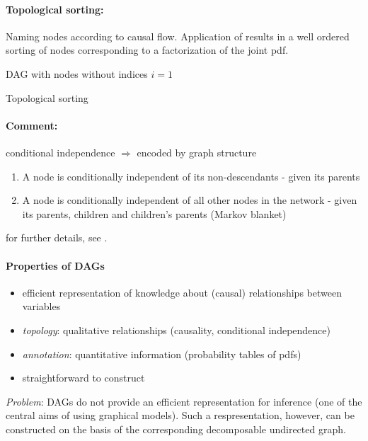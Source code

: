 \paragraph{Topological sorting:} Naming nodes according to causal
flow. Application of  results
in a well ordered sorting of nodes corresponding to a factorization of
the joint pdf.
\begin{algorithm}
  \DontPrintSemicolon
  DAG with nodes without indices\;
  $i = 1$\;
\caption{Topological sorting}
\label{alg:topological-sorting}
\end{algorithm}

\paragraph{Comment:} conditional independence $\Rightarrow$ encoded by graph structure
\begin{enumerate}[(1)]
\item A node is conditionally independent of its non-descendants - given its parents
\item A node is conditionally independent of all other nodes in the network - given its parents, children and children's parents (Markov blanket)
\end{enumerate}
for further details, see \textcite[ch.14, Fig 14.4]{RussellNorvig2003}.

\paragraph{Properties of DAGs}
\begin{itemize}
	\item efficient representation of knowledge about (causal) relationships 
		between variables
	\item \emph{topology}: qualitative relationships (causality, conditional 
		independence)
	\item \emph{annotation}: quantitative information (probability tables of pdfs)
	\item straightforward to construct
\end{itemize}
\emph{Problem}: DAGs do not provide an efficient representation for
inference (one of the central aims of using graphical models). Such a
respresentation, however, can be constructed on the basis of the
corresponding decomposable undirected graph.

